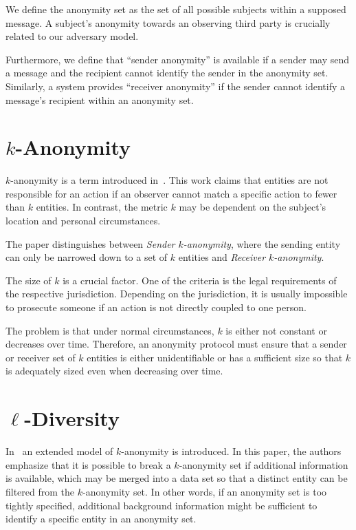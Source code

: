 We define the anonymity set as the set of all possible subjects within a supposed message. A subject's anonymity towards an observing third party is crucially related to our adversary model.

Furthermore, we define that ``sender anonymity'' is available if a sender may send a message and the recipient cannot identify the sender in the anonymity set. Similarly, a system provides ``receiver anonymity'' if the sender cannot identify a message's recipient within an anonymity set.

\section{\texorpdfstring{$k$}{k}-Anonymity}
$k$-anonymity is a term introduced in~\cite{k-anonymous:ccs2003}. This work claims that entities are not responsible for an action if an observer cannot match a specific action to fewer than $k$ entities. In contrast, the metric $k$ may be dependent on the subject's location and personal circumstances.

The paper distinguishes between \textit{Sender $k$-anonymity}, where the sending entity can only be narrowed down to a set of $k$ entities and \textit{Receiver $k$-anonymity}. 

The size of $k$ is a crucial factor. One of the criteria is the legal requirements of the respective jurisdiction. Depending on the jurisdiction, it is usually impossible to prosecute someone if an action is not directly coupled to one person. 

The problem is that under normal circumstances, $k$ is either not constant or decreases over time. Therefore, an anonymity protocol must ensure that a sender or receiver set of $k$ entities is either unidentifiable or has a sufficient size so that $k$ is adequately sized even when decreasing over time.

\section{\texorpdfstring{$\ell$}{l}-Diversity}
In~\cite{machanavajjhala2007diversity} an extended model of $k$-anonymity is introduced. In this paper, the authors emphasize that it is possible to break a $k$-anonymity set if additional information is available, which may be merged into a data set so that a distinct entity can be filtered from the $k$-anonymity set. In other words, if an anonymity set is too tightly specified, additional background information might be sufficient to identify a specific entity in an anonymity set.

